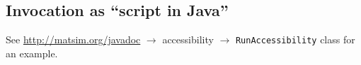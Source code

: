 \subsection{Invocation as ``script in Java''}

See \url{http://matsim.org/javadoc} $\to$ accessibility $\to$ \lstinline{RunAccessibility} class for an example.




